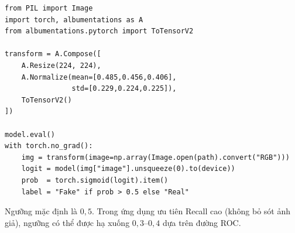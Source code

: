 \begin{lstlisting}[style=python, caption={Pipeline phân loại ảnh mới}]
from PIL import Image
import torch, albumentations as A
from albumentations.pytorch import ToTensorV2

transform = A.Compose([
    A.Resize(224, 224),
    A.Normalize(mean=[0.485,0.456,0.406],
                std=[0.229,0.224,0.225]),
    ToTensorV2()
])

model.eval()
with torch.no_grad():
    img = transform(image=np.array(Image.open(path).convert("RGB")))
    logit = model(img["image"].unsqueeze(0).to(device))
    prob  = torch.sigmoid(logit).item()
    label = "Fake" if prob > 0.5 else "Real"
\end{lstlisting}

Ngưỡng mặc định là $0{,}5$. Trong ứng dụng ưu tiên Recall cao (không bỏ sót ảnh giả), ngưỡng có thể được hạ xuống $0{,}3$--$0{,}4$ dựa trên đường ROC.
